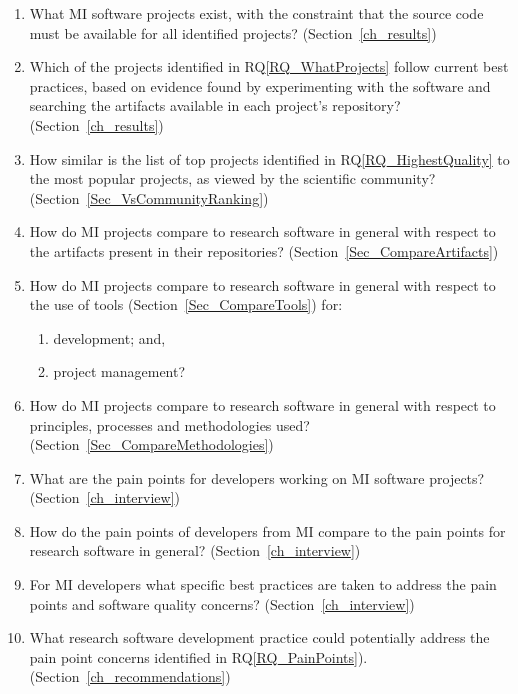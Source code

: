 \documentclass[final, 3p, times, authoryear]{elsarticle}
\newcounter{rqnum} %
\newcommand{\rqref}[1]{RQ\ref{#1}}
\begin{document}
\begin{enumerate}
	\item[RQ\refstepcounter{rqnum}\therqnum \label{RQ_WhatProjects}:] What MI
	software projects exist, with the constraint that the source code must be
	available for all identified projects? (Section~\ref{ch_results})
	\item [RQ\refstepcounter{rqnum}\therqnum \label{RQ_HighestQuality}:] Which
	of the projects identified in \rqref{RQ_WhatProjects} follow current best
	practices, based on evidence found by experimenting with the software and
	searching the artifacts available in each project's repository?
	(Section~\ref{ch_results})
	\item [RQ\refstepcounter{rqnum}\therqnum \label{RQ_CompareHQ2Popular}:] How
	similar is the list of top projects identified in \rqref{RQ_HighestQuality}
	to the most popular projects, as viewed by the scientific community?
	(Section~\ref{Sec_VsCommunityRanking})
    \item [RQ\refstepcounter{rqnum}\therqnum \label{RQ_CompareArtifacts}:] How
	do MI projects compare to research software in general with respect to the
	artifacts present in their repositories?
	(Section~\ref{Sec_CompareArtifacts})
	\item [RQ\refstepcounter{rqnum}\therqnum \label{RQ_CompareToolsProjMngmnt}:]
	How do MI projects compare to research software in general with respect to
	the use of tools (Section~\ref{Sec_CompareTools}) for:
	\begin{enumerate} 
		\item [\rqref{RQ_CompareToolsProjMngmnt}.a] development; and,
		\item [\rqref{RQ_CompareToolsProjMngmnt}.b] project management?
	\end{enumerate}
	\item [RQ\refstepcounter{rqnum}\therqnum \label{RQ_CompareMethodologies}:]
	How do MI projects compare to research software in general with respect to
	principles, processes and methodologies used?
	(Section~\ref{Sec_CompareMethodologies})
	\item [RQ\refstepcounter{rqnum}\therqnum \label{RQ_PainPoints}:] What are
	the pain points for developers working on MI software projects?
	(Section~\ref{ch_interview})
	\item [RQ\refstepcounter{rqnum}\therqnum \label{RQ_ComparePainPoints}:] How
	do the pain points of developers from MI compare to the pain points
	for research software in general? (Section~\ref{ch_interview})
	\item [RQ\refstepcounter{rqnum}\therqnum \label{RQ_Concerns}:] For MI
	developers what specific best practices are taken to address the pain points
	and software quality concerns? (Section~\ref{ch_interview})
	\item [RQ\refstepcounter{rqnum}\therqnum \label{RQ_Recommend}:]
	What research software development practice could potentially address the
	pain point concerns identified in \rqref{RQ_PainPoints}).
	(Section~\ref{ch_recommendations})

\end{enumerate}
\end{document}
